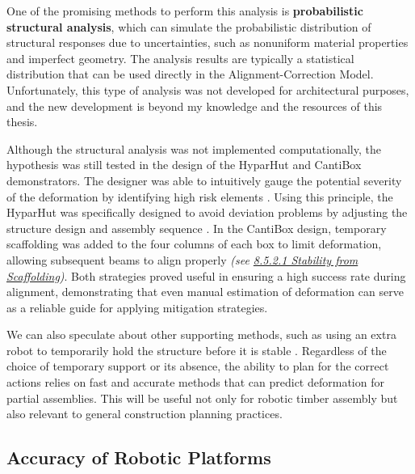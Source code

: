 

One of the promising methods to perform this analysis is \textbf{probabilistic structural analysis}, which can simulate the probabilistic distribution of structural responses due to uncertainties, such as nonuniform material properties and imperfect geometry\parencite{cruseProbabilisticStructuralAnalysis1988, kohlerProbabilisticModelingTimber2007}. The analysis results are typically a statistical distribution that can be used directly in the Alignment-Correction Model. Unfortunately, this type of analysis was not developed for architectural purposes, and the new development is beyond my knowledge and the resources of this thesis. 

Although the structural analysis was not implemented computationally, the hypothesis was still tested in the design of the HyparHut and CantiBox demonstrators. The designer was able to intuitively gauge the potential severity of the deformation by identifying high risk elements . Using this principle, the HyparHut was specifically designed to avoid deviation problems by adjusting the structure design and assembly sequence . In the CantiBox design, temporary scaffolding was added to the four columns of each box to limit deformation, allowing subsequent beams to align properly\textit{ (see \ul{8.5.2.1 Stability from Scaffolding})}. Both strategies proved useful in ensuring a high success rate during alignment, demonstrating that even manual estimation of deformation can serve as a reliable guide for applying mitigation strategies. 

We can also speculate about other supporting methods, such as using an extra robot to temporarily hold the structure before it is stable \parencite{paraschoCooperativeRoboticAssembly2019, thomaRoboticFabricationBespoke2018}. Regardless of the choice of temporary support or its absence, the ability to plan for the correct actions relies on fast and accurate methods that can predict deformation for partial assemblies. This will be useful not only for robotic timber assembly but also relevant to general construction planning practices.

\subsection{Accuracy of Robotic Platforms}
\label{subsection:new_hypo_accuracy_of_robotic_platforms}

